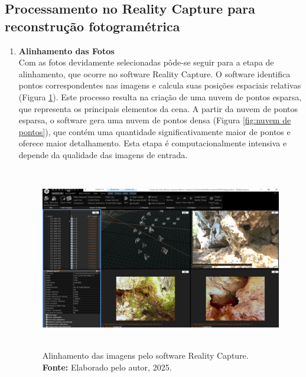     \subsection{Processamento no Reality Capture para reconstrução fotogramétrica}
    \begin{enumerate}
\item \textbf{Alinhamento das Fotos} \\
Com as fotos devidamente selecionadas pôde-se seguir para a etapa de alinhamento, que ocorre no software Reality Capture. O software identifica pontos correspondentes nas imagens e calcula suas posições espaciais relativas (Figura \ref{fig:alinhamento}). Este processo resulta na criação de uma nuvem de pontos esparsa, que representa os principais elementos da cena. 
A partir da nuvem de pontos esparsa, o software gera uma nuvem de pontos densa (Figura \ref{fig:nuvem de pontos}), que contém uma quantidade significativamente maior de pontos e oferece maior detalhamento. Esta etapa é computacionalmente intensiva e depende da qualidade das imagens de entrada.

\begin{figure}[H]
    \centering
        \centering
        \includegraphics[height=8cm, keepaspectratio]{img/reality e fotogrametria processo/cameras alinhamento.png}
        \caption{Alinhamento das imagens pelo software Reality Capture. \\
            \textbf{Fonte:} Elaborado pelo autor, 2025.}
        \label{fig:alinhamento}
\end{figure}


\end{enumerate}
